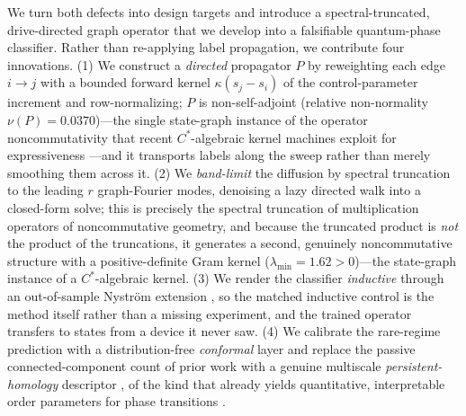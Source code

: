 \documentclass[aps,prresearch,reprint,amsmath,amssymb,nofootinbib,superscriptaddress,floatfix]{revtex4-2}
\theoremstyle{definition}
\theoremstyle{remark}
\theoremstyle{plain}
\begin{document}
We turn both defects into design targets and introduce a spectral-truncated, drive-directed graph
operator that we develop into a falsifiable quantum-phase classifier. Rather than re-applying label
propagation, we contribute four innovations. (1) We construct a \emph{directed} propagator $P$ by
reweighting each edge $i\!\to\!j$ with a bounded forward kernel $\kappa(s_j-s_i)$ of the control-parameter
increment and row-normalizing; $P$ is non-self-adjoint (relative non-normality $\nu(P)=\num{0.0370}$)---the single state-graph instance of the operator
noncommutativity that recent $C^*$-algebraic kernel machines exploit for expressiveness
\cite{hashimoto2026spectral,vansuijlekom2021spectral,connes2021truncations}---and it transports labels
along the sweep rather than merely smoothing them across it. (2) We \emph{band-limit} the diffusion by
spectral truncation to the leading $r$ graph-Fourier modes, denoising a lazy directed walk into a
closed-form solve; this is precisely the spectral truncation of multiplication operators of noncommutative
geometry, and because the truncated product is \emph{not} the product of the truncations, it generates a
second, genuinely noncommutative structure with a positive-definite Gram kernel ($\lambda_{\min}=\num{1.62}>0$)---the state-graph instance
of a $C^*$-algebraic kernel. (3) We render the classifier \emph{inductive} through an out-of-sample
Nystr\"om extension \cite{williams2001nystrom,bengio2004oos}, so the matched inductive control is the
method itself rather than a missing experiment, and the trained operator transfers to states from a device
it never saw. (4) We calibrate the rare-regime prediction with a distribution-free \emph{conformal} layer
\cite{vovk2005algorithmic,lei2018distribution,guo2017calibration,angelopoulos2021gentle,romano2020aps,huang2023cfgnn}
and replace the passive
connected-component count of prior work with a genuine multiscale \emph{persistent-homology} descriptor
\cite{edelsbrunner2010computational,carlsson2009topology}, of the kind that already yields quantitative,
interpretable order parameters for phase transitions \cite{cole2021persistent}.
\end{document}
